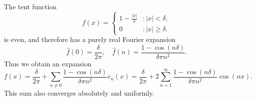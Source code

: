 \begin{example}
    The tent function
    \[ f(x) = \begin{cases} 1 - \frac{|x|}{\delta} & : |x| < \delta, \\ 0 & : |x| \geq \delta. \end{cases} \]
    is even, and therefore has a purely real Fourier expansion
    \[ \hat{f}(0) = \frac{\delta}{2\pi},\quad\hat{f}(n) = \frac{1 - \cos(n\delta)}{\delta \pi n^2}. \]
    Thus we obtain an expansion
    \[ f(x) = \frac{\delta}{2\pi} + \sum_{n \neq 0} \frac{1 - \cos(n\delta)}{\delta \pi n^2} e_n(x) = \frac{\delta}{2 \pi} + 2 \sum_{n = 1}^\infty \frac{1 - \cos(n\delta)}{\delta \pi n^2} \cos(nx). \]
    This sum also converges absolutely and uniformly.
\end{example}

